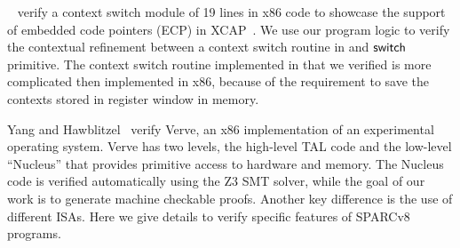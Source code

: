 
~\cite{ctxm} verify a context switch module of 19 lines
in x86 code to showcase the support of embedded
code pointers (ECP) in XCAP~\cite{xcap}. 
We use our program logic to verify the contextual 
refinement between a context switch routine in \sparc{} 
and $\mathsf{switch}{}$ primitive. The context switch routine 
implemented in \sparc{} that we verified 
is more complicated then 
implemented in x86, because of the requirement to save 
the contexts stored in register window in memory.

Yang and Hawblitzel~\cite{YangPLDI10} verify Verve, an x86 
implementation of an experimental operating system. Verve has two 
levels, the high-level TAL code and the low-level ``Nucleus'' 
that provides primitive access to hardware and memory. 
The Nucleus code is verified automatically using the Z3 SMT solver,
while the goal of our work is to generate machine checkable proofs.
Another key difference is the use of different ISAs. Here
we give details to verify specific features of SPARCv8 programs.

